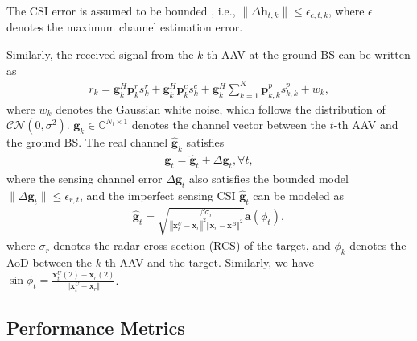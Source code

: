 \documentclass[twocolumn,journal]{IEEEtran}
\begin{document}
The CSI error is assumed to be bounded \cite{xuResource2025}, i.e., \(\|\Delta\boldsymbol{h}_{t,k}\| \leq \epsilon_{c,t,k}\), where \(\epsilon\) denotes the maximum channel estimation error. 

Similarly, the received signal from the \(k\)-th AAV at the ground BS can be written as 
\begin{align}
 r_k = \boldsymbol{g}^{H}_{k}\boldsymbol{p}^{r}_{k} {s}^{r}_{k} + \boldsymbol{g}^{H}_{k}\boldsymbol{p}^{c}_{k}{s}^{c}_{k} + \boldsymbol{g}^{H}_{k}\sum_{k=1}^{K} \boldsymbol{p}^{p}_{k,k} {s}^{p}_{k,k} + w_k,
\end{align}
where \(w_k\) denotes the Gaussian white noise, which follows the distribution of \(\mathcal{CN}(0,\sigma^2)\). \(\boldsymbol{g}_{k}\in\mathbb{C}^{N_t \times 1}\) denotes the channel vector between the \(t\)-th AAV and the ground BS. The real channel \(\hat{\boldsymbol{g}}_{k}\) satisfies
\begin{align}
 \boldsymbol{g}_{t} = \hat{\boldsymbol{g}}_{t} + \Delta\boldsymbol{g}_{t}, \forall t,\label{eq:sensingChannelUncertainty}
\end{align} 
where the sensing channel error \(\Delta\boldsymbol{g}_{t}\) also satisfies the bounded model \(\|\Delta\boldsymbol{g}_{t}\| \leq \epsilon_{r,t}\), and the imperfect sensing CSI \(\hat{\boldsymbol{g}}_{t}\) can be modeled as
\begin{align}
 \hat{\boldsymbol{g}}_{t} = \sqrt{\frac{\beta \sigma_r}{\left\Vert \boldsymbol{x}^{U}_{t} - \boldsymbol{x}_{r} \right\Vert^2 \left\Vert \boldsymbol{x}_{r} - \boldsymbol{x}^{B} \right\Vert^2}}\boldsymbol{a}(\phi_{t}),
\end{align}
where \(\sigma_r\) denotes the radar cross section (RCS) of the target, and \(\phi_{k}\) denotes the AoD between the \(k\)-th AAV and the target. Similarly, we have \(\sin\phi_{t} = \frac{\boldsymbol{x}^{U}_{t}(2) - \boldsymbol{x}_{r}(2)}{\Vert \boldsymbol{x}^{U}_{t} - \boldsymbol{x}_{r}\Vert}\).

\subsection{Performance Metrics}
\end{document}
